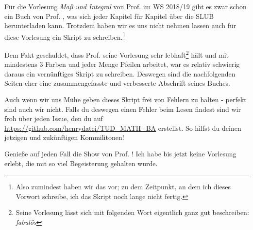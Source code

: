 Für die Vorlesung \textit{Maß und Integral} von Prof.  im WS 2018/19 gibt es zwar schon ein Buch von Prof. , was sich jeder Kapitel für Kapitel über die SLUB herunterladen kann. Trotzdem haben wir es uns nicht nehmen lassen auch für diese Vorlesung ein Skript zu schreiben.\footnote{Also zumindest haben wir das vor; zu dem
 Zeitpunkt, an dem ich dieses Vorwort schreibe, ich das Skript noch lange nicht fertig.}

Dem Fakt geschuldet, dass Prof.  seine Vorlesung sehr lebhaft\footnote{Seine Vorlesung lässt sich mit folgenden Wort eigentlich ganz gut beschreiben: \textit{fabulös}} hält und mit mindestens 3 Farben und jeder Menge Pfeilen arbeitet, war es relativ schwierig daraus ein vernünftiges Skript zu schreiben. Deswegen sind die nachfolgenden Seiten eher eine zusammengefasste und verbesserte Abschrift seines Buches.

Auch wenn wir uns Mühe geben dieses Skript frei von Fehlern zu halten - perfekt sind auch wir nicht. Falls du deswegen einen Fehler beim Lesen findest sind wir froh über jeden Issue, den du auf \url{https://github.com/henrydatei/TUD_MATH_BA} erstellst. So hilfst du deinen jetzigen und zukünftigen Kommilitonen!

Genieße auf jeden Fall die Show von Prof.  \smiley{}! Ich habe bis jetzt keine Vorlesung erlebt, die mit so viel Begeisterung gehalten wurde.